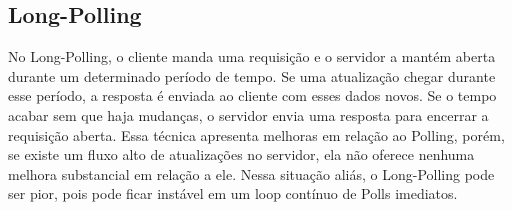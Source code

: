 \documentclass[a4paper,12pt]{article}
\begin{document}
\subsection{Long-Polling}

No Long-Polling, o cliente manda uma requisição e o servidor a mantém aberta durante um determinado período de tempo. Se uma atualização chegar durante esse período, a resposta é enviada ao cliente com esses dados novos. Se o tempo acabar sem que haja mudanças, o servidor envia uma resposta para encerrar a requisição aberta. Essa técnica apresenta melhoras em relação ao Polling, porém, se existe um fluxo alto de atualizações no servidor, ela não oferece nenhuma melhora substancial em relação a ele. Nessa situação aliás, o Long-Polling pode ser pior, pois pode ficar instável em um loop contínuo de Polls imediatos.







\end{document}
